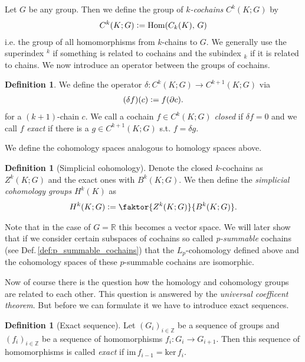 \documentclass[12pt,a4paper]{article}
\numberwithin{equation}{subsection}
\numberwithin{lemma}{subsection}
\theoremstyle{definition}
\newtheorem{definition}[lemma]{Definition}
\newcommand{\integers}{\mathbb{Z}}
\newcommand{\real}{\mathbb{R}}
\begin{document}
Let $G$ be any group. Then we define the group 
of \textit{$k$-cochains} $C^k(K;G)$ by
\begin{align*}
    C^k(K;G) \vcentcolon= \text{Hom}(C_k(K),\,G)
\end{align*}
i.e. the group of all homomorphisms from $k$-chains to $G$. 
We generally use the superindex $^k$ if something is related to 
cochains and the subindex $_k$ if it is related to chains. 
We now introduce an operator between the groups of cochains.
\begin{definition}
    We define the operator $\delta: C^k(K;G) \rightarrow C^{k+1}(K;G)$ via
    \begin{align*}
        (\delta f) (c) \vcentcolon= f(\partial c).
    \end{align*}
    for a $(k+1)$-chain $c$.
    We call a cochain $f \in C^k(K;G)$ \textit{closed} if $\delta f = 0$ 
    and we call $f$
    \textit{exact} if there is a $g \in C^{k+1}(K;G)$ s.t. $f = \delta g$.
\end{definition}
\noindent We define the cohomology spaces analogous to homology spaces above.
\begin{definition}[Simplicial cohomology]
    Denote the closed $k$-cochains as $Z^k(K;G)$ and the 
    exact ones with $B^k(K;G)$. 
    We then define the \textit{simplicial cohomology groups}
    $H^k(K)$ as
    \begin{align*}
        H^k(K;G) \vcentcolon= \faktor{Z^k(K;G)}{B^k(K;G)}.
    \end{align*}
\end{definition}
Note that in the case of $G = \real$ this becomes a vector space.
We will later show that if we consider certain subspaces of cochains so called
\textit{p-summable} cochains (see Def.\,\ref{def:p_summable_cochains}) 
that the $L_p$-cohomology defined above and the
cohomology spaces of these $p$-summable cochains are isomorphic.


Now of course there is the question how the homology and cohomology groups 
are related to each other. This question is answered by the
\textit{universal coefficent theorem}. But before we can formulate it we have 
to introduce exact sequences.
\begin{definition}[Exact sequence]
    Let $(G_i)_{i\in \integers}$ be a sequence of groups and 
    $(f_i)_{i \in \integers}$ be a sequence of homomorphisms
    $f_i: G_i \rightarrow G_{i+1}$. Then this sequence of homomorphisms is
    called \textit{exact} if $\text{im}\,f_{i-1} = \text{ker}\,f_i$.
\end{definition}
\end{document}

